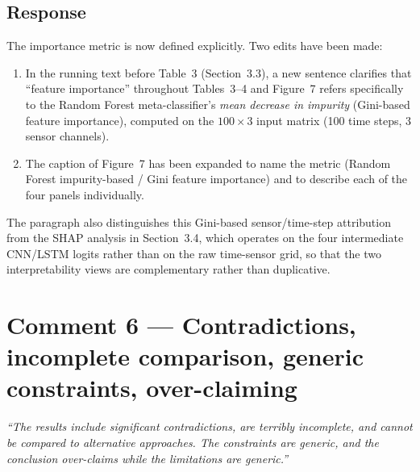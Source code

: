 \documentclass[11pt,a4paper]{article}
\begin{document}
\subsection*{Response}
The importance metric is now defined explicitly. Two edits have been made:
\begin{enumerate}
  \item In the running text before Table~3 (Section~3.3), a new sentence clarifies that ``feature importance'' throughout Tables~3--4 and Figure~7 refers specifically to the Random Forest meta-classifier's \emph{mean decrease in impurity} (Gini-based feature importance), computed on the $100 \times 3$ input matrix (100 time steps, 3 sensor channels).
  \item The caption of Figure~7 has been expanded to name the metric (Random Forest impurity-based / Gini feature importance) and to describe each of the four panels individually.
\end{enumerate}
The paragraph also distinguishes this Gini-based sensor/time-step attribution from the SHAP analysis in Section~3.4, which operates on the four intermediate CNN/LSTM logits rather than on the raw time-sensor grid, so that the two interpretability views are complementary rather than duplicative.

\section*{Comment 6 — Contradictions, incomplete comparison, generic constraints, over-claiming}
\textit{``The results include significant contradictions, are terribly incomplete, and cannot be compared to alternative approaches. The constraints are generic, and the conclusion over-claims while the limitations are generic.''}
\end{document}
